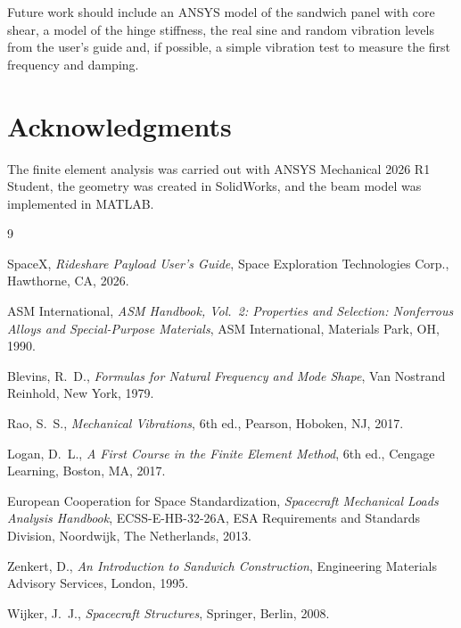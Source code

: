 \documentclass[letterpaper,10pt]{article}
\begin{document}
Future work should include an ANSYS model of the sandwich panel with core shear, a
model of the hinge stiffness, the real sine and random vibration levels from the
user's guide and, if possible, a simple vibration test to measure the first frequency
and damping.

\section*{Acknowledgments}

The finite element analysis was carried out with ANSYS Mechanical 2026 R1 Student,
the geometry was created in SolidWorks, and the beam model was implemented in MATLAB.

\renewcommand{\refname}{References}
\begin{thebibliography}{9}
\setlength{\itemsep}{0pt}
\small

SpaceX, \textit{Rideshare Payload User's Guide}, Space Exploration Technologies Corp.,
Hawthorne, CA, 2026.

ASM International, \textit{ASM Handbook, Vol.~2: Properties and Selection:
Nonferrous Alloys and Special-Purpose Materials}, ASM International, Materials Park,
OH, 1990.

Blevins, R.~D., \textit{Formulas for Natural Frequency and Mode Shape}, Van Nostrand
Reinhold, New York, 1979.

Rao, S.~S., \textit{Mechanical Vibrations}, 6th ed., Pearson, Hoboken, NJ, 2017.

Logan, D.~L., \textit{A First Course in the Finite Element Method}, 6th ed.,
Cengage Learning, Boston, MA, 2017.

European Cooperation for Space Standardization, \textit{Spacecraft Mechanical Loads
Analysis Handbook}, ECSS-E-HB-32-26A, ESA Requirements and Standards Division,
Noordwijk, The Netherlands, 2013.

Zenkert, D., \textit{An Introduction to Sandwich Construction}, Engineering Materials
Advisory Services, London, 1995.

Wijker, J.~J., \textit{Spacecraft Structures}, Springer, Berlin, 2008.

\end{thebibliography}
\end{document}
